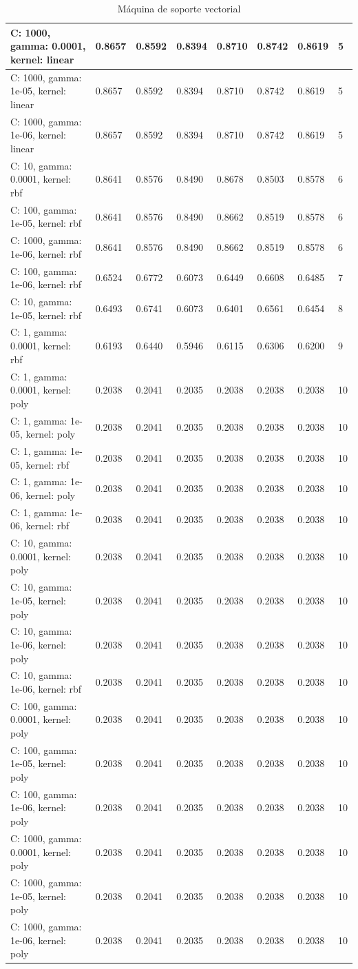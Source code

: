 \begin{table}[H]
{\begin{tabular}{|l|l|l|l|l|l|l|l|}
\hline
C: 1000, gamma: 0.0001, kernel: linear&0.8657&0.8592&0.8394&0.8710&0.8742&0.8619&5\\
\hline
C: 1000, gamma: 1e-05, kernel: linear&0.8657&0.8592&0.8394&0.8710&0.8742&0.8619&5\\
\hline
C: 1000, gamma: 1e-06, kernel: linear&0.8657&0.8592&0.8394&0.8710&0.8742&0.8619&5\\
\hline
C: 10, gamma: 0.0001, kernel: rbf&0.8641&0.8576&0.8490&0.8678&0.8503&0.8578&6\\
\hline
C: 100, gamma: 1e-05, kernel: rbf&0.8641&0.8576&0.8490&0.8662&0.8519&0.8578&6\\
\hline
C: 1000, gamma: 1e-06, kernel: rbf&0.8641&0.8576&0.8490&0.8662&0.8519&0.8578&6\\
\hline
C: 100, gamma: 1e-06, kernel: rbf&0.6524&0.6772&0.6073&0.6449&0.6608&0.6485&7\\
\hline
C: 10, gamma: 1e-05, kernel: rbf&0.6493&0.6741&0.6073&0.6401&0.6561&0.6454&8\\
\hline
C: 1, gamma: 0.0001, kernel: rbf&0.6193&0.6440&0.5946&0.6115&0.6306&0.6200&9\\
\hline
C: 1, gamma: 0.0001, kernel: poly&0.2038&0.2041&0.2035&0.2038&0.2038&0.2038&10\\
\hline
C: 1, gamma: 1e-05, kernel: poly&0.2038&0.2041&0.2035&0.2038&0.2038&0.2038&10\\
\hline
C: 1, gamma: 1e-05, kernel: rbf&0.2038&0.2041&0.2035&0.2038&0.2038&0.2038&10\\
\hline
C: 1, gamma: 1e-06, kernel: poly&0.2038&0.2041&0.2035&0.2038&0.2038&0.2038&10\\
\hline
C: 1, gamma: 1e-06, kernel: rbf&0.2038&0.2041&0.2035&0.2038&0.2038&0.2038&10\\
\hline
C: 10, gamma: 0.0001, kernel: poly&0.2038&0.2041&0.2035&0.2038&0.2038&0.2038&10\\
\hline
C: 10, gamma: 1e-05, kernel: poly&0.2038&0.2041&0.2035&0.2038&0.2038&0.2038&10\\
\hline
C: 10, gamma: 1e-06, kernel: poly&0.2038&0.2041&0.2035&0.2038&0.2038&0.2038&10\\
\hline
C: 10, gamma: 1e-06, kernel: rbf&0.2038&0.2041&0.2035&0.2038&0.2038&0.2038&10\\
\hline
C: 100, gamma: 0.0001, kernel: poly&0.2038&0.2041&0.2035&0.2038&0.2038&0.2038&10\\
\hline
C: 100, gamma: 1e-05, kernel: poly&0.2038&0.2041&0.2035&0.2038&0.2038&0.2038&10\\
\hline
C: 100, gamma: 1e-06, kernel: poly&0.2038&0.2041&0.2035&0.2038&0.2038&0.2038&10\\
\hline
C: 1000, gamma: 0.0001, kernel: poly&0.2038&0.2041&0.2035&0.2038&0.2038&0.2038&10\\
\hline
C: 1000, gamma: 1e-05, kernel: poly&0.2038&0.2041&0.2035&0.2038&0.2038&0.2038&10\\
\hline
C: 1000, gamma: 1e-06, kernel: poly&0.2038&0.2041&0.2035&0.2038&0.2038&0.2038&10\\
\hline

	\end{tabular}
}
\caption{Máquina de soporte vectorial}
\label{tab:cp5:msv}
\end{table}
